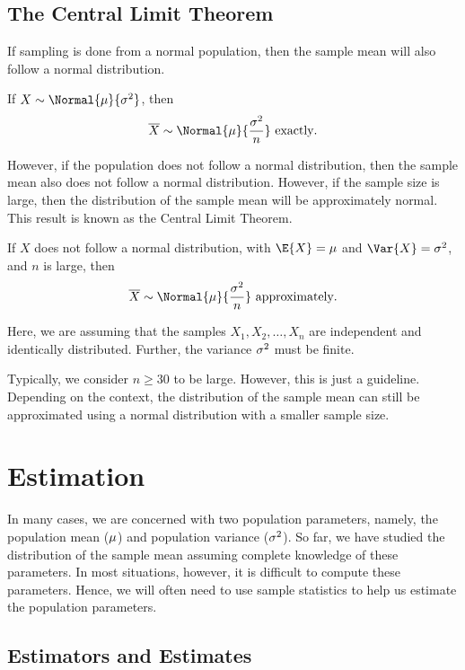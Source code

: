 \subsection{The Central Limit Theorem}

If sampling is done from a normal population, then the sample mean will also follow a normal distribution.

\begin{proposition}
    If $X \sim \Normal{\m}{\s^2}$, then \[\ol{X} \sim \Normal{\m}{\frac{\s^2}{n}} \text{ exactly}.\]
\end{proposition}

However, if the population does not follow a normal distribution, then the sample mean also does not follow a normal distribution. However, if the sample size is large, then the distribution of the sample mean will be approximately normal. This result is known as the Central Limit Theorem.

\begin{theorem}
    If $X$ does not follow a normal distribution, with $\E{X} = \m$ and $\Var{X} = \s^2$, and $n$ is large, then \[\ol{X} \sim \Normal{\m}{\frac{\s^2}{n}} \text{ approximately}.\]
\end{theorem}

Here, we are assuming that the samples $X_1, X_2, \dots, X_n$ are independent and identically distributed. Further, the variance $\sigma^2$ must be finite.

Typically, we consider $n \geq 30$ to be large. However, this is just a guideline. Depending on the context, the distribution of the sample mean can still be approximated using a normal distribution with a smaller sample size.

\section{Estimation}

In many cases, we are concerned with two population parameters, namely, the population mean ($\mu$) and population variance ($\sigma^2$). So far, we have studied the distribution of the sample mean assuming complete knowledge of these parameters. In most situations, however, it is difficult to compute these parameters. Hence, we will often need to use sample statistics to help us estimate the population parameters.

\subsection{Estimators and Estimates}

